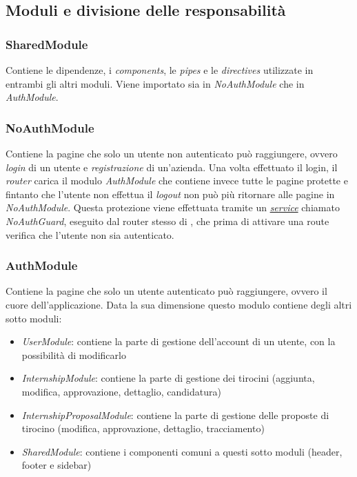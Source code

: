 \subsection{Moduli e divisione delle responsabilità}
\label{client:modules}
\subsubsection{SharedModule}
\label{client:shared-module}
Contiene le dipendenze, i \textit{components}, le \textit{pipes} e le \textit{directives} utilizzate in entrambi gli altri moduli. Viene importato sia in \textit{NoAuthModule} che in \textit{AuthModule}.

\subsubsection{NoAuthModule}
\label{client:no-auth-module}
Contiene la pagine che solo un utente non autenticato può raggiungere, ovvero \textit{login} di un utente e \textit{registrazione} di un'azienda. Una volta effettuato il login, il \textit{router} carica il modulo \textit{AuthModule} che contiene invece tutte le pagine protette e fintanto che l'utente non effettua il \textit{logout} non può più ritornare alle pagine in \textit{NoAuthModule}. Questa protezione viene effettuata tramite un \hyperref[chap:client:services]{\textit{service}} chiamato \textit{NoAuthGuard}, eseguito dal router stesso di \angular, che prima di attivare una route verifica che l'utente non sia autenticato.


\subsubsection{AuthModule}
\label{client:auth-module}
Contiene la pagine che solo un utente autenticato può raggiungere, ovvero il cuore dell'applicazione. Data la sua dimensione questo modulo contiene degli altri sotto moduli:
\begin{itemize}
	\item \textit{UserModule}: contiene la parte di gestione dell'account di un utente, con la possibilità di modificarlo
	\item \textit{InternshipModule}: contiene la parte di gestione dei tirocini (aggiunta, modifica, approvazione, dettaglio, candidatura)
	\item \textit{InternshipProposalModule}: contiene la parte di gestione delle proposte di tirocino (modifica, approvazione, dettaglio, tracciamento)
	\item \textit{SharedModule}: contiene i componenti comuni a questi sotto moduli (header, footer e sidebar)
\end{itemize}

